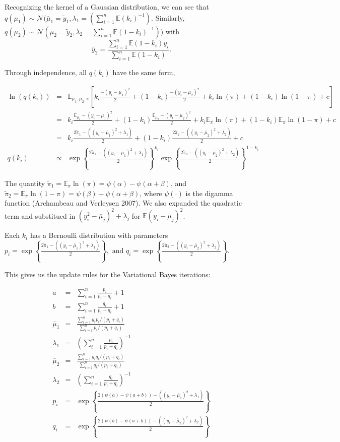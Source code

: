 \documentclass[12pt]{article}\usepackage[]{graphicx}\usepackage[]{color}
\begin{document}
Recognizing the kernel of a Gaussian distribution, we can see that $q(\mu_1) \sim \mathcal{N} (\bar{\mu}_{1} = \tilde{y}_1, \lambda_{1} = (\sum_{i=1}^{n}\mathbb{E}(k_i)^{-1}).$
Similarly, $q(\mu_2) \sim \mathcal{N} (\bar{\mu}_{2} = \tilde{y}_2, \lambda_{2} = \sum_{i=1}^{n}\mathbb{E}(1-k_i)^{-1}))$ with
$$\tilde{y_2} = \frac{\sum_{i=1}^{n} \mathbb{E}(1-k_i)y_i}{\sum_{i=1}^{n} \mathbb{E}(1-k_i)}.$$

Through independence, all $q(k_i)$ have the same form,

\begin{eqnarray*}
\ln(q(k_i)) & = & \mathbb{E}_{\mu_1, \mu_2, \pi} \left[ k_{i} \frac{-(y_i-\mu_1)^2}{2} + (1-k_{i}) \frac{-(y_i-\mu_2)^2}{2} + k_i \ln(\pi) + (1-k_i) \ln(1-\pi) + c \right]\\
& = & k_i\frac{\mathbb{E}_{\mu_1} -(y_i-\mu_1)^2}{2}  + (1-k_i) \frac{\mathbb{E}_{\mu_2} -(y_i-\mu_2)^2}{2}  + k_i \mathbb{E}_\pi \ln(\pi) + (1-k_i) \mathbb{E}_\pi \ln(1-\pi) + c \\
& = & k_i \frac{2\tilde{\pi}_1-((y_i - \bar{\mu}_1)^2 + \lambda_1)}{2} + (1-k_i) \frac{2\tilde{\pi}_2-((y_i - \bar{\mu}_2)^2 + \lambda_2)}{2} + c\\
q(k_i) & \propto & \exp \left\{\frac{2\tilde{\pi}_1-((y_i - \bar{\mu}_1)^2 + \lambda_1)}{2} \right\}^{k_i} \exp \left\{\frac{2\tilde{\pi}_2-((y_i - \bar{\mu}_2)^2 + \lambda_2)}{2} \right\}^{1-k_i}
\end{eqnarray*}

The quantity $\tilde{\pi}_1 = \mathbb{E}_\pi \ln(\pi) = \psi(\alpha)-\psi(\alpha+\beta)$, and $\tilde{\pi}_2 = \mathbb{E}_\pi \ln(1-\pi) = \psi(\beta)-\psi(\alpha+\beta)$, where $\psi(\cdot)$ is the digamma function (Archambeau and Verleysen 2007). We also expanded the quadratic term and substitued in $(y_i^2 - \bar{\mu}_j)^2 + \lambda_j$ for $\mathbb{E} (y_i-\mu_j)^2$.


Each $k_i$ has a Bernoulli distribution with parameters $p_i = \exp \left\{\frac{2\tilde{\pi}_1-((y_i - \bar{\mu}_1)^2 + \lambda_1)}{2} \right\}, \mbox{ and } q_i = \exp \left\{\frac{2\tilde{\pi}_2-((y_i - \bar{\mu}_2)^2 + \lambda_2)}{2} \right\}.$

This gives us the update rules for the Variational Bayes iterations:

\begin{eqnarray*}
a & = & \sum_{i=1}^{n} \frac{p_i}{p_i+q_i} + 1 \\
b & = & \sum_{i=1}^{n} \frac{q_i}{p_i+q_i} + 1 \\
\bar{\mu}_1 & = &  \frac{\sum_{i=1}^{n} y_i p_i /(p_i+q_i)}{\sum_{i=1}^{n} p_i /(p_i+q_i)} \\
\lambda_1 & = & \left(\sum_{i=1}^{n} \frac{p_i}{p_i+q_i}\right)^{-1} \\
\bar{\mu}_2 & = &  \frac{\sum_{i=1}^{n} y_i q_i /(p_i+q_i)}{\sum_{i=1}^{n} q_i /(p_i+q_i)} \\
\lambda_2 & = & \left(\sum_{i=1}^{n} \frac{q_i}{p_i+q_i}\right)^{-1} \\
p_i & = & \exp \left\{\frac{2(\psi(a)-\psi(a+b))-((y_i - \bar{\mu}_1)^2 + \lambda_1)}{2} \right\} \\
q_i & = & \exp \left\{\frac{2(\psi(b)-\psi(a+b))-((y_i - \bar{\mu}_2)^2 + \lambda_2)}{2} \right\}
\end{eqnarray*}
\end{document}
